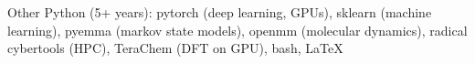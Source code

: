 
\begin{rubric}{Other}
\noentry{}
	Python (5+ years): pytorch (deep learning, GPUs), sklearn (machine learning), pyemma (markov state models), openmm (molecular dynamics), radical cybertools (HPC), TeraChem (DFT on GPU), bash, \LaTeX
\end{rubric}

